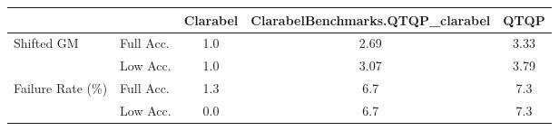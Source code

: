 \begin{tabular}{|l|l|c|c|c|}
  \hline
   &  & \textbf{Clarabel} & \textbf{ClarabelBenchmarks.QTQP\_clarabel} & \textbf{QTQP} \\
  \hline
  Shifted GM & Full Acc. & 1.0 & 2.69 & 3.33 \\
   & Low Acc. & 1.0 & 3.07 & 3.79 \\
  Failure Rate (\%) & Full Acc. & 1.3 & 6.7 & 7.3 \\
   & Low Acc. & 0.0 & 6.7 & 7.3 \\
  \hline
\end{tabular}
